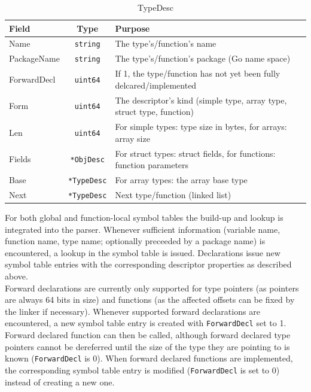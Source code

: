 \documentclass[a4paper]{scrartcl}
\begin{document}
      \begin{table}[htb]
      \centering
      \begin{tabular}{lc p{}}
        \toprule
        \textbf{Field} & \textbf{Type} & \textbf{Purpose}\\
        \midrule
        Name & \texttt{string} & The type's/function's name\\
        PackageName & \texttt{string} & The type's/function's package (Go name space)\\
        ForwardDecl & \texttt{uint64} & If 1, the type/function has not yet been fully delcared/implemented\\
        Form & \texttt{uint64} & The descriptor's kind (simple type, array type, struct type, function)\\
        Len & \texttt{uint64} & For simple types: type size in bytes, for arrays: array size\\
        Fields & \texttt{*ObjDesc} & For struct types: struct fields, for functions: function parameters\\
        Base & \texttt{*TypeDesc} & For array types: the array base type\\
        Next & \texttt{*TypeDesc} & Next type/function (linked list)\\
        \bottomrule
      \end{tabular}
      \caption{TypeDesc}
      \label{tbl:typedesc}
      \end{table}

    For both global and function-local symbol tables the build-up and lookup is integrated into the parser. Whenever sufficient information (variable name, function name, type name; optionally preceeded by a package name) is encountered, a lookup in the symbol table is issued. Declarations issue new symbol table entries with the corresponding descriptor properties as described above.\\
    Forward declarations are currently only supported for type pointers (as pointers are always 64 bits in size) and functions (as the affected offsets can be fixed by the linker if necessary). Whenever supported forward declarations are encountered, a new symbol table entry is created with \texttt{ForwardDecl} set to 1. Forward declared function can then be called, although forward declared type pointers cannot be dereferred until the size of the type they are pointing to is known (\texttt{ForwardDecl} is 0). When forward declared functions are implemented, the corresponding symbol table entry is modified (\texttt{ForwardDecl} is set to 0) instead of creating a new one.
      
\end{document}
